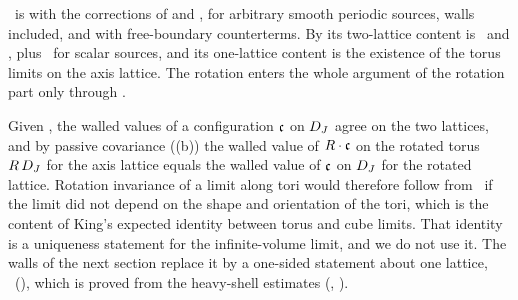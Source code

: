 \begin{remark}\label{rot:rem:Kstatus}
\Kz\ is \cite[Thm.~2.4]{K2} with the corrections of  and , for arbitrary smooth periodic sources, walls included, and with free-boundary counterterms. By  its two-lattice content is \hypF\ and \hypV, plus \hypCc\ for scalar sources, and its one-lattice content is the existence of the torus limits on the axis lattice. The rotation enters the whole argument of the rotation part only through .
\end{remark}

\begin{remark}\label{rot:rem:shape}
Given \Kz, the walled values of a configuration $\mathfrak c$ on $D_J$ agree on the two lattices, and by passive covariance ((b)) the walled value of $R\cdot\mathfrak c$ on the rotated torus $R\,D_J$ for the axis lattice equals the walled value of $\mathfrak c$ on $D_J$ for the rotated lattice. Rotation invariance of a limit along tori would therefore follow from \Kz\ if the limit did not depend on the shape and orientation of the tori, which is the content of King's expected identity \cite[(2.24)]{K2} between torus and cube limits. That identity is a uniqueness statement for the infinite-volume limit, and we do not use it. The walls of the next section replace it by a one-sided statement about one lattice, \TIz\ (), which is proved from the heavy-shell estimates (, ).
\end{remark}












